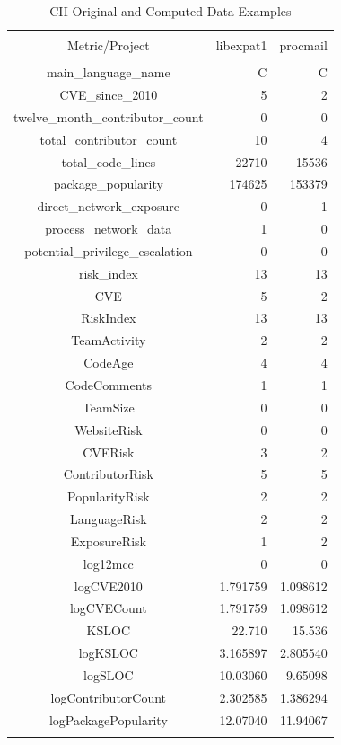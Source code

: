 \begin{table}[!htbp] \centering 
		\caption{CII Original and Computed Data Examples}
		\label{tab:cii_data_examples}
	\begin{tabular}{@{\extracolsep{5pt}} crr} 
		\\[-1.8ex]\hline \\[-1.8ex] 
		Metric/Project & libexpat1 & procmail \\ 
		\hline \\[-1.8ex] 
		main\_language\_name & C & C \\ 
		CVE\_since\_2010 & 5 & 2 \\ 
		twelve\_month\_contributor\_count & 0 & 0 \\ 
		total\_contributor\_count & 10 &  4 \\ 
		total\_code\_lines & 22710 & 15536 \\ 
		package\_popularity & 174625 & 153379 \\ 
		direct\_network\_exposure & 0 & 1 \\ 
		process\_network\_data & 1 & 0 \\ 
		potential\_privilege\_escalation & 0 & 0 \\ 
		risk\_index & 13 & 13 \\ 
		CVE & 5 & 2 \\ 
		RiskIndex & 13 & 13 \\ 
		TeamActivity & 2 & 2 \\ 
		CodeAge & 4 & 4 \\ 
		CodeComments & 1 & 1 \\ 
		TeamSize & 0 & 0 \\ 
		WebsiteRisk & 0 & 0 \\ 
		CVERisk & 3 & 2 \\ 
		ContributorRisk & 5 & 5 \\ 
		PopularityRisk & 2 & 2 \\ 
		LanguageRisk & 2 & 2 \\ 
		ExposureRisk & 1 & 2 \\ 
		log12mcc & 0 & 0 \\ 
		logCVE2010 & 1.791759 & 1.098612 \\ 
		logCVECount & 1.791759 & 1.098612 \\ 
		KSLOC & 22.710 & 15.536 \\ 
		logKSLOC & 3.165897 & 2.805540 \\ 
		logSLOC & 10.03060 &  9.65098 \\ 
		logContributorCount & 2.302585 & 1.386294 \\ 
		logPackagePopularity & 12.07040 & 11.94067 \\ 
		\hline \\[-1.8ex] 
	\end{tabular} 
\end{table} 

